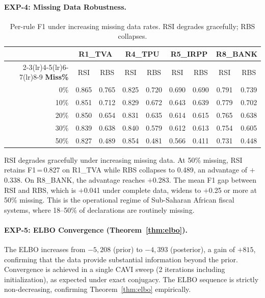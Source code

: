 \documentclass[letterpaper]{article}
\begin{document}
\paragraph{EXP-4: Missing Data Robustness.}

\begin{table}[H]
\centering
\caption{Per-rule F1 under increasing missing data rates. RSI degrades
         gracefully; RBS collapses.}
\label{tab:missing}
\renewcommand{\arraystretch}{1.2}
\begin{tabular}{r cc cc cc cc}
\toprule
& \multicolumn{2}{c}{\textbf{R1\_TVA}}
& \multicolumn{2}{c}{\textbf{R4\_TPU}}
& \multicolumn{2}{c}{\textbf{R5\_IRPP}}
& \multicolumn{2}{c}{\textbf{R8\_BANK}} \\
\cmidrule(lr){2-3}\cmidrule(lr){4-5}\cmidrule(lr){6-7}\cmidrule(lr){8-9}
\textbf{Miss\%} & RSI & RBS & RSI & RBS & RSI & RBS & RSI & RBS \\
\midrule
  0\% & 0.865 & 0.765 & 0.825 & 0.720 & 0.690 & 0.690 & 0.791 & 0.739 \\
 10\% & 0.851 & 0.712 & 0.829 & 0.672 & 0.643 & 0.639 & 0.779 & 0.702 \\
 20\% & 0.850 & 0.654 & 0.831 & 0.635 & 0.614 & 0.615 & 0.765 & 0.638 \\
 30\% & 0.839 & 0.638 & 0.840 & 0.579 & 0.612 & 0.613 & 0.754 & 0.605 \\
 50\% & 0.827 & 0.489 & 0.854 & 0.481 & 0.566 & 0.411 & 0.731 & 0.448 \\
\bottomrule
\end{tabular}
\end{table}

RSI degrades gracefully under increasing missing data. At 50\%
missing, RSI retains F1\,=\,0.827 on R1\_TVA while RBS collapses to
0.489, an advantage of $+$0.338. On R8\_BANK, the advantage reaches
$+$0.283. The mean F1 gap between RSI and RBS, which is $+$0.041
under complete data, widens to $+$0.25 or more at 50\% missing. This
is the operational regime of Sub-Saharan African fiscal systems, where
18--50\% of declarations are routinely missing.

\paragraph{EXP-5: ELBO Convergence (Theorem~\ref{thm:elbo}).}

The ELBO increases from $-5{,}208$ (prior) to $-4{,}393$ (posterior),
a gain of $+815$, confirming that the data provide substantial
information beyond the prior. Convergence is achieved in a single CAVI
sweep (2 iterations including initialization), as expected under exact
conjugacy. The ELBO sequence is strictly non-decreasing, confirming
Theorem~\ref{thm:elbo} empirically.
\end{document}
